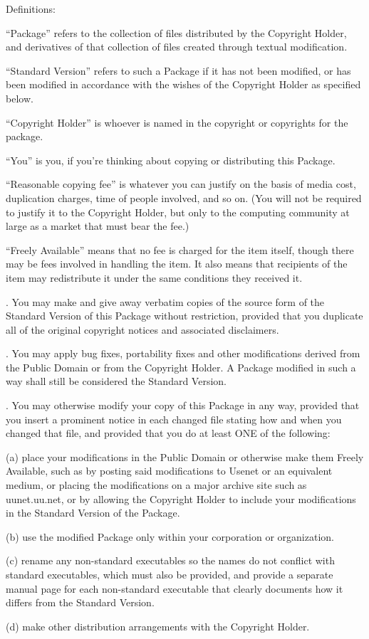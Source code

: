 \documentclass[10pt,letterpaper,titlepage]{article}
\newenvironment{lquote}{\begin{list}{}{}\item[]}{\end{list}}
\begin{document}
\noindent
Definitions:
\begin{lquote}
``Package'' refers to the collection of files distributed by the Copyright Holder, and derivatives of that collection of files created through textual modification.

``Standard Version'' refers to such a Package if it has not been modified, or has been modified in accordance with the wishes of the Copyright Holder as specified below.

``Copyright Holder'' is whoever is named in the copyright or copyrights for the package.

``You'' is you, if you're thinking about copying or distributing this Package.

``Reasonable copying fee'' is whatever you can justify on the basis of media cost, duplication charges, time of people involved, and so on.  (You will not be required to justify it to the Copyright Holder, but only to the computing community at large as a market that must bear the fee.)

``Freely Available'' means that no fee is charged for the item itself, though there may be fees involved in handling the item.  It also means that recipients of the item may redistribute it under the same conditions they received it.
\end{lquote}

. You may make and give away verbatim copies of the source form of the Standard Version of this Package without restriction, provided that you duplicate all of the original copyright notices and associated disclaimers.
\vspace{8pt}

. You may apply bug fixes, portability fixes and other modifications derived from the Public Domain or from the Copyright Holder.  A Package modified in such a way shall still be considered the Standard Version.
\vspace{8pt}

. You may otherwise modify your copy of this Package in any way, provided that you insert a prominent notice in each changed file stating how and when you changed that file, and provided that you do at least ONE of the following:

\begin{lquote}
(a) place your modifications in the Public Domain or otherwise make them Freely Available, such as by posting said modifications to Usenet or an equivalent medium, or placing the modifications on a major archive site such as uunet.uu.net, or by allowing the Copyright Holder to include your modifications in the Standard Version of the Package.

(b) use the modified Package only within your corporation or organization.

(c) rename any non-standard executables so the names do not conflict with standard executables, which must also be provided, and provide a separate manual page for each non-standard executable that clearly documents how it differs from the Standard Version.

(d) make other distribution arrangements with the Copyright Holder.
\end{lquote}
\end{document}
